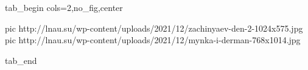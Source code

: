  
 
 
 
 

\ifcmt
  tab_begin cols=2,no_fig,center

     pic http://lnau.su/wp-content/uploads/2021/12/zachinyaev-den-2-1024x575.jpg
		 pic http://lnau.su/wp-content/uploads/2021/12/mynka-i-derman-768x1014.jpg

  tab_end
\fi
